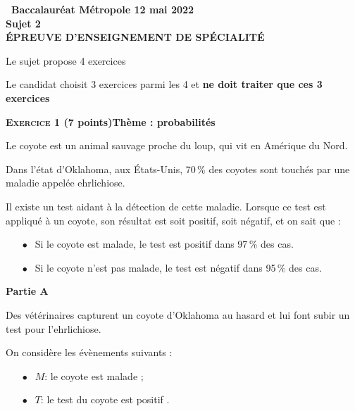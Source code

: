 \documentclass[11pt,a4paper,french]{article}
\begin{document}
\setlength\parindent{0mm}
\pagestyle{fancy}
\thispagestyle{empty}

\begin{center}{\Large\textbf{\decofourleft~Baccalauréat Métropole 12 mai 2022~\decofourright\\[6pt]  Sujet 2\\[7pt] ÉPREUVE D'ENSEIGNEMENT DE SPÉCIALITÉ}}
\end{center}

\vspace{0,25cm}

Le sujet propose 4 exercices

Le candidat choisit 3 exercices parmi les 4 et \textbf{ne doit traiter que ces 3 exercices}

\bigskip

\textbf{\textsc{Exercice 1} \quad (7 points)\hfill Thème : probabilités}

\medskip

Le coyote est un animal sauvage proche du loup, qui vit en Amérique du Nord.

Dans l'état d'Oklahoma, aux États-Unis, 70\,\% des coyotes sont touchés par une maladie appelée ehrlichiose.

Il existe un test aidant à la détection de cette maladie. Lorsque ce test est appliqué à un coyote, son résultat est soit positif, soit négatif, et on sait que :

\setlength\parindent{1cm}
\begin{itemize}
\item[$\bullet~~$] Si le coyote est malade, le test est positif dans 97\,\% des cas.
\item[$\bullet~~$] Si le coyote n'est pas malade, le test est négatif dans 95\,\% des cas.
\end{itemize}
\setlength\parindent{0cm}

\bigskip

\textbf{Partie A}

\medskip

Des vétérinaires capturent un coyote d'Oklahoma au hasard et lui font subir un test pour l'ehrlichiose.

On considère les évènements suivants :

\setlength\parindent{1cm}
\begin{itemize}
\item[$\bullet~~$]$M$: \og le coyote est malade \fg;
\item[$\bullet~~$]$T$: \og le test du coyote est positif \fg.
\end{itemize}
\setlength\parindent{0cm}
\end{document}
